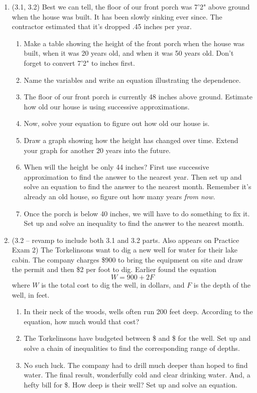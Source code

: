 \documentclass[12pt]{article}
\begin{document}
\begin{enumerate}
 \item  (3.1, 3.2)  Best we can tell, the floor of our front porch was 7'2" above ground when the house was built.  It has been slowly sinking ever since.  The contractor estimated that it's dropped .45 inches per year.
\begin{enumerate}
\item Make a table showing the height of the front porch when the house was built, when it was 20 years old, and when it was 50 years old.  Don't forget to convert 7'2" to inches first.
\item Name the variables and write an equation illustrating the dependence.
\item The floor of our front porch is currently 48 inches above ground.   Estimate how old our house is using successive approximations.
\item Now, solve your equation to figure out how old our house is.  
 \item Draw a graph showing how the height has changed over time.  Extend your graph for another 20 years into the future.
\item When will the height be only 44 inches?  First use successive approximation to find the answer to the nearest year.  Then set up and solve an equation to find the answer to the nearest month.  Remember it's already an old house, so figure out how many years \emph{from now.}
\item Once the porch is below 40 inches, we will have to do something to fix it. Set up and solve an inequality to find the answer to the nearest month.  
\end{enumerate} 

\item (3.2 -- revamp to include both 3.1 and 3.2 parts.  Also appears on Practice Exam 2) The Torkelinsons want to dig a new well for water for their lake cabin.  The company charges \$900 to bring the equipment on site and draw the permit and then \$2 per foot to dig.  Earlier found the equation $$W = 900 + 2F$$ where $W$ is the total cost to dig the well, in dollars, and $F$ is the depth of the well, in feet.
\begin{enumerate}
\item In their neck of the woods, wells often run 200 feet deep.  According to the equation, how much would that cost?
\item The Torkelinsons have budgeted between \$ and \$ for the well.  Set up and solve a chain of inequalities to find the corresponding range of depths.
\item No such luck.  The company had to drill much deeper than hoped to find water.  The final result, wonderfully cold and clear drinking water.  And, a hefty bill for \$.  How deep is their well?  Set up and solve an equation.
\end{enumerate} 


\end{enumerate}
\end{document}
